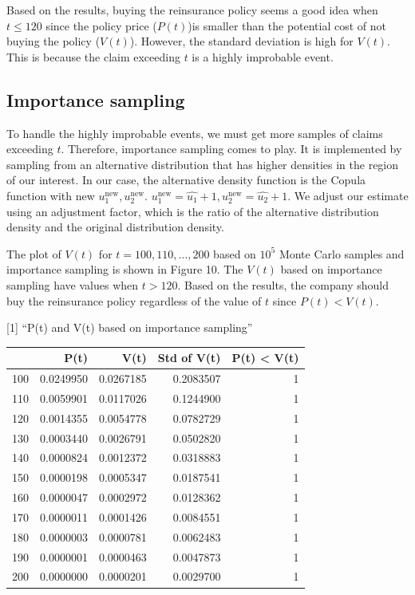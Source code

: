 \documentclass[11pt,]{article}
\begin{document}
Based on the results, buying the reinsurance policy seems a good idea
when \(t\leq120\) since the policy price (\(P(t)\))is smaller than the
potential cost of not buying the policy (\(V(t)\)). However, the
standard deviation is high for \(V(t)\). This is because the claim
exceeding \(t\) is a highly improbable event.

\hypertarget{importance-sampling}{%
\subsection{Importance sampling}\label{importance-sampling}}

To handle the highly improbable events, we must get more samples of
claims exceeding \(t\). Therefore, importance sampling comes to play. It
is implemented by sampling from an alternative distribution that has
higher densities in the region of our interest. In our case, the
alternative density function is the Copula function with new
\(u_{1}^{\textrm{new}},u_{2}^{\textrm{new}}\).
\(u_{1}^{\textrm{new}} = \hat{u_1} + 1 ,u_{2}^{\textrm{new}}= \hat{u_2}+1\).
We adjust our estimate using an adjustment factor, which is the ratio of
the alternative distribution density and the original distribution
density.

The plot of \(V(t)\) for \(t=100,110,…,200\) based on \(10^5\) Monte
Carlo samples and importance sampling is shown in Figure 10. The
\(V(t)\) based on importance sampling have values when \(t>120\). Based
on the results, the company should buy the reinsurance policy regardless
of the value of \(t\) since \(P(t) < V(t)\).

{[}1{]} ``P(t) and V(t) based on importance sampling''

\begin{longtable}[]{@{}lrrrr@{}}
\toprule
& P(t) & V(t) & Std of V(t) & P(t) \textless{} V(t)\tabularnewline
\midrule
\endhead
100 & 0.0249950 & 0.0267185 & 0.2083507 & 1\tabularnewline
110 & 0.0059901 & 0.0117026 & 0.1244900 & 1\tabularnewline
120 & 0.0014355 & 0.0054778 & 0.0782729 & 1\tabularnewline
130 & 0.0003440 & 0.0026791 & 0.0502820 & 1\tabularnewline
140 & 0.0000824 & 0.0012372 & 0.0318883 & 1\tabularnewline
150 & 0.0000198 & 0.0005347 & 0.0187541 & 1\tabularnewline
160 & 0.0000047 & 0.0002972 & 0.0128362 & 1\tabularnewline
170 & 0.0000011 & 0.0001426 & 0.0084551 & 1\tabularnewline
180 & 0.0000003 & 0.0000781 & 0.0062483 & 1\tabularnewline
190 & 0.0000001 & 0.0000463 & 0.0047873 & 1\tabularnewline
200 & 0.0000000 & 0.0000201 & 0.0029700 & 1\tabularnewline
\bottomrule
\end{longtable}
\end{document}
